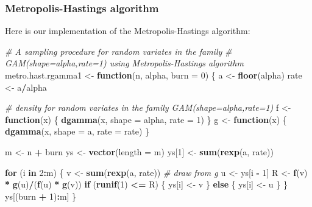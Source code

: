 \documentclass[
  11pt,
]{paper}
\newenvironment{Shaded}{\begin{snugshade}}{\end{snugshade}}
\newcommand{\AttributeTok}[1]{\textcolor[rgb]{0.13,0.29,0.53}{#1}}
\newcommand{\CommentTok}[1]{\textcolor[rgb]{0.56,0.35,0.01}{\textit{#1}}}
\newcommand{\ControlFlowTok}[1]{\textcolor[rgb]{0.13,0.29,0.53}{\textbf{#1}}}
\newcommand{\DecValTok}[1]{\textcolor[rgb]{0.00,0.00,0.81}{#1}}
\newcommand{\FunctionTok}[1]{\textcolor[rgb]{0.13,0.29,0.53}{\textbf{#1}}}
\newcommand{\NormalTok}[1]{#1}
\newcommand{\OtherTok}[1]{\textcolor[rgb]{0.56,0.35,0.01}{#1}}
\newcommand{\SpecialCharTok}[1]{\textcolor[rgb]{0.81,0.36,0.00}{\textbf{#1}}}
\begin{document}
\hypertarget{metropolis-hastings-algorithm}{%
\subsubsection{Metropolis-Hastings
algorithm}\label{metropolis-hastings-algorithm}}

Here is our implementation of the Metropolis-Hastings algorithm:

\begin{Shaded}
\begin{Highlighting}[]
\CommentTok{\# A sampling procedure for random variates in the family}
\CommentTok{\# GAM(shape=alpha,rate=1) using Metropolis{-}Hastings algorithm}
\NormalTok{metro.hast.rgamma1 }\OtherTok{\textless{}{-}} \ControlFlowTok{function}\NormalTok{(n, alpha, }\AttributeTok{burn =} \DecValTok{0}\NormalTok{) \{}
\NormalTok{    a }\OtherTok{\textless{}{-}} \FunctionTok{floor}\NormalTok{(alpha)}
\NormalTok{    rate }\OtherTok{\textless{}{-}}\NormalTok{ a}\SpecialCharTok{/}\NormalTok{alpha}

    \CommentTok{\# density for random variates in the family GAM(shape=alpha,rate=1)}
\NormalTok{    f }\OtherTok{\textless{}{-}} \ControlFlowTok{function}\NormalTok{(x) \{}
        \FunctionTok{dgamma}\NormalTok{(x, }\AttributeTok{shape =}\NormalTok{ alpha, }\AttributeTok{rate =} \DecValTok{1}\NormalTok{)}
\NormalTok{    \}}
\NormalTok{    g }\OtherTok{\textless{}{-}} \ControlFlowTok{function}\NormalTok{(x) \{}
        \FunctionTok{dgamma}\NormalTok{(x, }\AttributeTok{shape =}\NormalTok{ a, }\AttributeTok{rate =}\NormalTok{ rate)}
\NormalTok{    \}}

\NormalTok{    m }\OtherTok{\textless{}{-}}\NormalTok{ n }\SpecialCharTok{+}\NormalTok{ burn}
\NormalTok{    ys }\OtherTok{\textless{}{-}} \FunctionTok{vector}\NormalTok{(}\AttributeTok{length =}\NormalTok{ m)}
\NormalTok{    ys[}\DecValTok{1}\NormalTok{] }\OtherTok{\textless{}{-}} \FunctionTok{sum}\NormalTok{(}\FunctionTok{rexp}\NormalTok{(a, rate))}

    \ControlFlowTok{for}\NormalTok{ (i }\ControlFlowTok{in} \DecValTok{2}\SpecialCharTok{:}\NormalTok{m) \{}
\NormalTok{        v }\OtherTok{\textless{}{-}} \FunctionTok{sum}\NormalTok{(}\FunctionTok{rexp}\NormalTok{(a, rate))  }\CommentTok{\# draw from g}
\NormalTok{        u }\OtherTok{\textless{}{-}}\NormalTok{ ys[i }\SpecialCharTok{{-}} \DecValTok{1}\NormalTok{]}
\NormalTok{        R }\OtherTok{\textless{}{-}} \FunctionTok{f}\NormalTok{(v) }\SpecialCharTok{*} \FunctionTok{g}\NormalTok{(u)}\SpecialCharTok{/}\NormalTok{(}\FunctionTok{f}\NormalTok{(u) }\SpecialCharTok{*} \FunctionTok{g}\NormalTok{(v))}
        \ControlFlowTok{if}\NormalTok{ (}\FunctionTok{runif}\NormalTok{(}\DecValTok{1}\NormalTok{) }\SpecialCharTok{\textless{}=}\NormalTok{ R) \{}
\NormalTok{            ys[i] }\OtherTok{\textless{}{-}}\NormalTok{ v}
\NormalTok{        \} }\ControlFlowTok{else}\NormalTok{ \{}
\NormalTok{            ys[i] }\OtherTok{\textless{}{-}}\NormalTok{ u}
\NormalTok{        \}}
\NormalTok{    \}}
\NormalTok{    ys[(burn }\SpecialCharTok{+} \DecValTok{1}\NormalTok{)}\SpecialCharTok{:}\NormalTok{m]}
\NormalTok{\}}
\end{Highlighting}
\end{Shaded}
\end{document}
